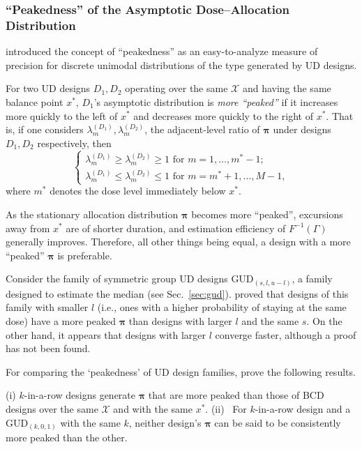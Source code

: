 \subsubsection{``Peakedness'' of the Asymptotic Dose--Allocation Distribution}

\cite{Giov:Pint:Pint:prop:1998} introduced the concept of ``peakedness'' as an easy-to-analyze measure of precision for discrete unimodal distributions of the type generated by UD designs.
%
\begin{defn}\label{def:peak}
For two UD designs $D_1,D_2$ operating over the same $\mathcal{X}$ and having the same balance point $x^*$, $D_1$'s asymptotic distribution is \emph{more ``peaked''} if it increases more quickly to the left of $x^*$ and decreases more quickly to the right of $x^*$. That is, if one considers $\lambda^{(D_1)}_m,\lambda^{(D_2)}_m$, the adjacent-level ratio of $\boldsymbol{\pi}$ under designs $D_1,D_2$ respectively, then
\begin{equation}\label{eq:peakdef}
\begin{cases}
\lambda^{(D_1)}_{m}\ge\lambda^{(D_2)}_{m}\ge 1\textrm{ for }m=1,\ldots,m^*-1; \\
\lambda^{(D_1)}_{m}\le\lambda^{(D_2)}_{m} \le 1\textrm{ for }m = m^*+1,\ldots,M-1,
\end{cases}
\end{equation}
where $m^*$ denotes the dose level immediately below $x^*$.
\end{defn}
%
As the stationary allocation distribution $\boldsymbol{\pi}$ becomes more ``peaked'', excursions away from $x^*$ are of shorter duration, and estimation efficiency of $F^{-1}\left(\Gamma\right)$ generally improves. Therefore, all other things being equal, a design with a more ``peaked'' $\boldsymbol{\pi}$ is preferable.

Consider the family of symmetric group UD designs GUD$_{(s,l,u-l)}$, a family designed to estimate the median (see Sec.~\ref{sec:gud}). \cite{Oron07} proved that designs of this family with smaller $l$ (i.e., ones with a higher probability of staying at the same dose) have a more peaked $\boldsymbol{\pi}$ than designs with larger $l$ and the same $s$. On the other hand, it appears that designs with larger $l$ converge faster, although a proof has not been found.

For comparing the `peakedness' of UD design families, \cite{Oron:Hoff:thek:2009} prove the following results.
%
\begin{thm}\label{thm:peak} (i) $k$-in-a-row designs generate $\boldsymbol{\pi}$ that are more peaked than those of BCD designs over the same $\mathcal{X}$ and with the same $x^*$.
%
\noindent (ii) \ For $k$-in-a-row design and a GUD$_{(k,0,1)}$ with the same $k$, neither design's $\boldsymbol{\pi}$ can be said to be consistently more peaked than the other.
\end{thm}

